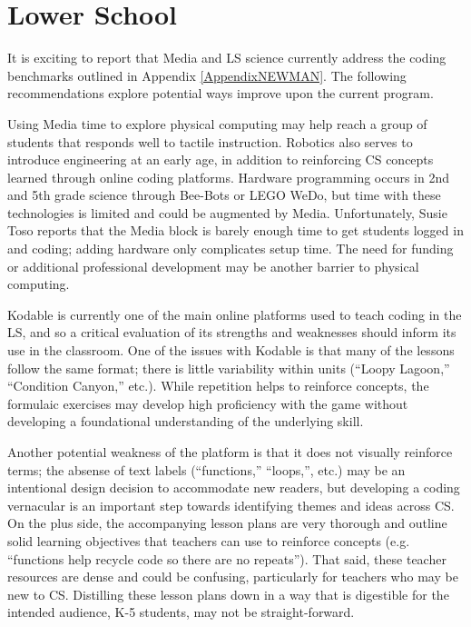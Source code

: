 \section{Lower School}
It is exciting to report that Media and LS science currently address the coding benchmarks outlined in Appendix \ref{AppendixNEWMAN}. The following recommendations explore potential ways improve upon the current program.\par 
Using Media time to explore physical computing may help reach a group of students that responds well to tactile instruction. Robotics also serves to introduce engineering at an early age, in addition to reinforcing CS concepts learned through online coding platforms. Hardware programming occurs in 2nd and 5th grade science through Bee-Bots or LEGO WeDo, but time with these technologies is limited and could be augmented by Media. Unfortunately, Susie Toso reports that the Media block is barely enough time to get students logged in and coding; adding hardware only complicates setup time. The need for funding or additional professional development may be another barrier to physical computing.\par
Kodable is currently one of the main online platforms used to teach coding in the LS, and so a critical evaluation of its strengths and weaknesses should inform its use in the classroom. One of the issues with Kodable is that many of the lessons follow the same format; there is little variability within units (``Loopy Lagoon,'' ``Condition Canyon,'' etc.). While repetition helps to reinforce concepts, the formulaic exercises may develop high proficiency with the game without developing a foundational understanding of the underlying skill.\par 
Another potential weakness of the platform is that it does not visually reinforce terms; the absense of text labels (``functions,'' ``loops,'', etc.) may be an intentional design decision to accommodate new readers, but developing a coding vernacular is an important step towards identifying themes and ideas across CS. On the plus side, the accompanying lesson plans are very thorough and outline solid learning objectives that teachers can use to reinforce concepts (e.g. ``functions help recycle code so there are no repeats''). That said, these teacher resources are dense and could be confusing, particularly for teachers who may be new to CS. Distilling these lesson plans down in a way that is digestible for the intended audience, K-5 students, may not be straight-forward.\par
